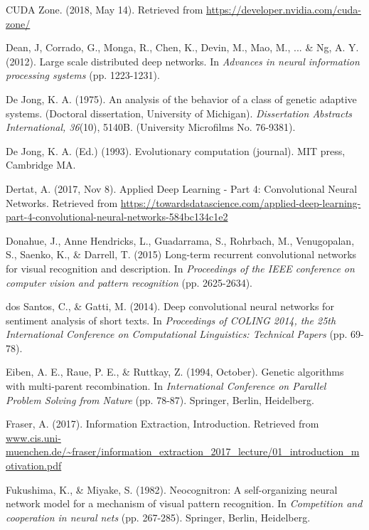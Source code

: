 \documentclass[11pt,a4paper,twoside,openright]{scrbook}
\begin{document}
\begin{thebibliography}{99}
 CUDA Zone. (2018, May 14). Retrieved from \url{https://developer.nvidia.com/cuda-zone/}

 Dean, J, Corrado, G., Monga, R., Chen, K., Devin, M., Mao, M., ... \& Ng, A. Y. (2012). Large scale distributed deep networks. In \emph{Advances in neural information processing systems} (pp. 1223-1231).

 De Jong, K. A. (1975). An analysis of the behavior of a class of genetic adaptive systems. (Doctoral dissertation, University of Michigan). \emph{Dissertation Abstracts International, 36}(10), 5140B. (University Microfilms No. 76-9381).

 De Jong, K. A. (Ed.) (1993). Evolutionary computation (journal). MIT press, Cambridge MA.

 Dertat, A. (2017, Nov 8). Applied Deep Learning - Part 4: Convolutional Neural Networks. Retrieved from \url{https://towardsdatascience.com/applied-deep-learning-part-4-convolutional-neural-networks-584bc134c1e2}

 Donahue, J., Anne Hendricks, L., Guadarrama, S., Rohrbach, M., Venugopalan, S., Saenko, K., \& Darrell, T. (2015) Long-term recurrent convolutional networks for visual recognition and description. In \emph{Proceedings of the IEEE conference on computer vision and pattern recognition} (pp. 2625-2634).

 dos Santos, C., \& Gatti, M. (2014). Deep convolutional neural networks for sentiment analysis of short texts. In \emph{Proceedings of COLING 2014, the 25th International Conference on Computational Linguistics: Technical Papers} (pp. 69-78).

 Eiben, A. E., Raue, P. E., \& Ruttkay, Z. (1994, October). Genetic algorithms with multi-parent recombination. In \emph{International Conference on Parallel Problem Solving from Nature} (pp. 78-87). Springer, Berlin, Heidelberg.

 Fraser, A. (2017). Information Extraction, Introduction. Retrieved from \url{www.cis.uni-muenchen.de/~fraser/information_extraction_2017_lecture/01_introduction_motivation.pdf}

 Fukushima, K., \& Miyake, S. (1982). Neocognitron: A self-organizing neural network model for a mechanism of visual pattern recognition. In \emph{Competition and cooperation in neural nets} (pp. 267-285). Springer, Berlin, Heidelberg.


\end{thebibliography}
\end{document}
